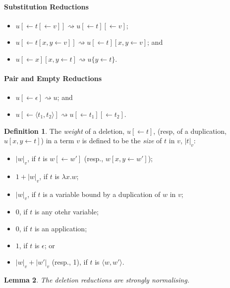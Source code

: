 \documentclass[11pt,a4paper]{article}
\theoremstyle{definition}
\newtheorem{definition}{Definition}
\theoremstyle{plain}
\newtheorem{lemma}[definition]{Lemma}
\theoremstyle{remark}
\begin{document}
\paragraph{Substitution Reductions}

\begin{itemize}
	\item $u[\leftarrow t[\leftarrow v]]\rightsquigarrow u[\leftarrow t][\leftarrow v]$;
	\item $u[\leftarrow t[x,y\leftarrow v]]\rightsquigarrow u[\leftarrow t][x,y\leftarrow v]$; and
	\item $u[\leftarrow x][x,y\leftarrow t]\rightsquigarrow u\{y\leftarrow t\}$.
\end{itemize}

\paragraph{Pair and Empty Reductions}

\begin{itemize}
	\item $u[\leftarrow\epsilon]\rightsquigarrow u$; and
	\item $u[\leftarrow\langle t_1,t_2\rangle]\rightsquigarrow u[\leftarrow t_1][\leftarrow t_2]$.
\end{itemize}

\begin{definition}
	The \emph{weight} of a deletion, $u[\leftarrow t]$, (resp, of a duplication, $u[x,y\leftarrow t]$) in a term $v$ is defined to be the \emph{size} of $t$ in $v$, $|t|_v$:
	\begin{itemize}
		\item $|w|_v$, if $t$ is $w[\leftarrow w']$ (resp., $w[x,y\leftarrow w']$);
		\item $1+|w|_v$, if $t$ is $\lambda x.w$;
		\item $|w|_v$, if $t$ is a variable bound by a duplication of $w$ in $v$;
		\item $0$, if $t$ is any otehr variable;
		\item $0$, if $t$ is an application;
		\item $1$, if $t$ is $\epsilon$; or
		\item $|w|_v+|w'|_v$ (resp., 1), if $t$ is $\langle w,w'\rangle$.
	\end{itemize}
\end{definition}

\begin{lemma}
The deletion reductions are strongly normalising.
\end{lemma}
\end{document}
